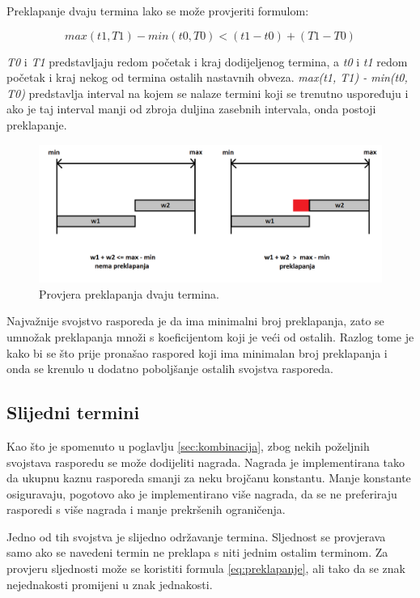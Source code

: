 \documentclass[times, utf8, zavrsni]{fer}
\begin{document}
Preklapanje dvaju termina lako se može provjeriti formulom:

\begin{equation}
max(t1, T1) - min(t0, T0) < (t1 - t0) + (T1  - T0)
\label{eq:preklapanje}
\end{equation}

\emph{T0} i \emph{T1} predstavljaju redom početak i kraj dodijeljenog termina, a \emph{t0} i \emph{t1} redom početak i kraj nekog od termina ostalih nastavnih obveza. \emph{max(t1, T1) - min(t0, T0)} predstavlja interval na kojem se nalaze termini koji se trenutno uspoređuju i ako je taj interval manji od zbroja duljina zasebnih intervala, onda postoji preklapanje.

\begin{figure}[htb]
\centering
\includegraphics[width=15cm]{images/preklapanja.png}
\caption{Provjera preklapanja dvaju termina.}
\label{fig:preklapanja}
\end{figure}

Najvažnije svojstvo rasporeda je da ima minimalni broj preklapanja, zato se umnožak preklapanja množi s koeficijentom koji je veći od ostalih. Razlog tome je kako bi se što prije pronašao raspored koji ima minimalan broj preklapanja i onda se krenulo u dodatno poboljšanje ostalih svojstva rasporeda.

\subsection{Slijedni termini}

Kao što je spomenuto u poglavlju \ref{sec:kombinacija}, zbog nekih poželjnih svojstava rasporedu se može dodijeliti nagrada. Nagrada je implementirana tako da ukupnu kaznu rasporeda smanji za neku brojčanu konstantu. Manje konstante osiguravaju, pogotovo ako je implementirano više nagrada, da se ne preferiraju rasporedi s više nagrada i manje prekršenih ograničenja. 

Jedno od tih svojstva je slijedno održavanje termina. Sljednost se provjerava samo ako se navedeni termin ne preklapa s niti jednim ostalim terminom. Za provjeru sljednosti može se koristiti formula \ref{eq:preklapanje}, ali tako da se znak nejednakosti promijeni u znak jednakosti.
\end{document}
